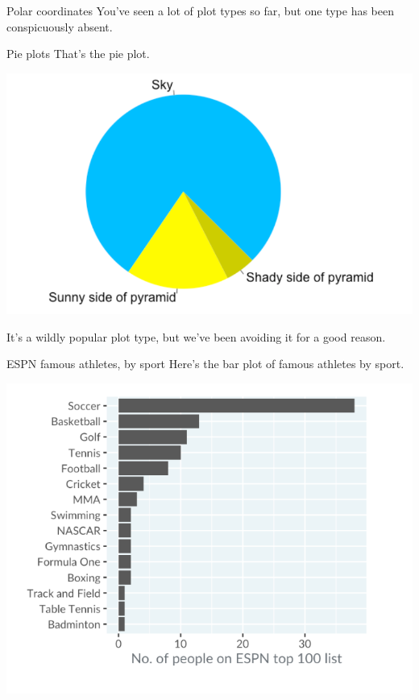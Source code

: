 \documentclass[
  ignorenonframetext,
]{beamer}
\begin{document}
\begin{frame}{Polar coordinates}
\label{polar-coordinates}
You've seen a lot of plot types so far, but one type has been
conspicuously absent.
\end{frame}

\begin{frame}{Pie plots}
\label{pie-plots}
That's the pie plot.

\includegraphics{../images/im101.png}

It's a wildly popular plot type, but we've been avoiding it for a good
reason.
\end{frame}

\begin{frame}{ESPN famous athletes, by sport}
\label{espn-famous-athletes-by-sport}
Here's the bar plot of famous athletes by sport.

\includegraphics{../images/im102.png}
\end{frame}
\end{document}
